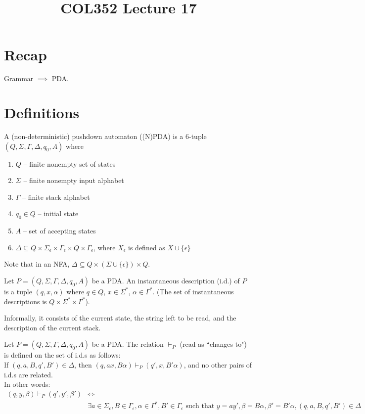 \documentclass[a4paper]{article}
\title{\textbf{COL352 Lecture 17}}
\date{}
\newcommand{\nl}{\vspace{0.2cm}\\}
\newcommand{\changesto}{\vdash}
\begin{document}
\maketitle
\tableofcontents

\section{Recap}

Grammar $\implies$ PDA.

\section{Definitions}

\begin{defn}
    A (non-deterministic) pushdown automaton ((N)PDA) is a 6-tuple $(Q, \Sigma, \Gamma, \Delta, q_0, A)$ where
    \begin{enumerate}
        \item $Q$ -- finite nonempty set of states
        \item $\Sigma$ -- finite nonempty input alphabet
        \item $\Gamma$ -- finite stack alphabet
        \item $q_0 \in Q$ -- initial state
        \item $A$ -- set of accepting states
        \item $\Delta \subseteq Q \times \Sigma_\epsilon \times \Gamma_\epsilon \times Q \times \Gamma_\epsilon$, where $X_\epsilon$ is defined as $X \cup \{\epsilon\}$
    \end{enumerate}
\end{defn}

Note that in an NFA, $\Delta \subseteq Q \times (\Sigma \cup \{\epsilon\}) \times Q$.

\begin{defn}
    Let $P = (Q, \Sigma, \Gamma, \Delta, q_0, A)$ be a PDA. An instantaneous description (i.d.) of $P$ is a tuple $(q, x, \alpha)$ where $q \in Q$, $x \in \Sigma^*$, $\alpha \in \Gamma^*$. (The set
    of instantaneous descriptions is $Q \times \Sigma^* \times \Gamma^*$).
\end{defn}

Informally, it consists of the current state, the string left to be read, and the description of the current stack.\nl

\begin{defn}
    Let $P = (Q, \Sigma, \Gamma, \Delta, q_0, A)$ be a PDA. The relation $\changesto_P$ (read as ``changes to") is defined on the set of i.d.s as follows:\nl
    If $(q, a, B, q', B') \in \Delta$, then $(q, ax, B\alpha) \changesto_P (q', x, B'\alpha)$, and no other pairs of i.d.s are related.\nl
    In other words:
    \begin{align*}
        (q, y, \beta) \changesto_P (q', y', \beta') &\iff\\ &\exists a \in \Sigma_\epsilon, B \in \Gamma_\epsilon, \alpha \in \Gamma^*, B' \in \Gamma_\epsilon \text{ such that } y = ay', \beta =
    B\alpha, \beta' = B'\alpha, (q, a, B, q', B') \in \Delta
    \end{align*}
\end{defn}
\end{document}

